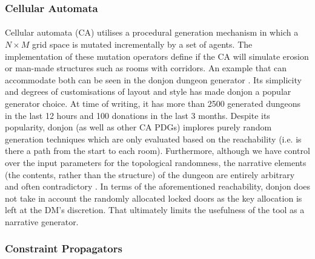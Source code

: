 \documentclass{UoYCSproject}
\begin{document}
\subsubsection{Cellular Automata}
\paragraph{}
Cellular automata (CA) utilises a procedural generation mechanism in which a $N \times M$ grid space is mutated incrementally by a set of agents. The implementation of these mutation operators define if the CA will simulate erosion \parencite{donjonCA} or man-made structures such as rooms with corridors. An example that can accommodate both can be seen in the donjon dungeon generator \parencite{donjonPDG}. Its simplicity and degrees of customisations of layout and style has made donjon a popular generator choice. At time of writing, it has more than 2500 generated dungeons in the last 12 hours and 100 donations in the last 3 months. Despite its popularity, donjon (as well as other CA PDGs) implores purely random generation techniques which are only evaluated based on the reachability (i.e. is there a path from the start to each room). Furthermore, although we have control over the input parameters for the topological randomness, the narrative elements (the contents, rather than the structure) of the dungeon are entirely arbitrary and often contradictory \parencite{Thrall,Brown}. In terms of the aforementioned reachability, donjon does not take in account the randomly allocated locked doors as the key allocation is left at the DM's discretion. That ultimately limits the usefulness of the tool as a narrative generator. %

\subsubsection{Constraint Propagators}
\end{document}
